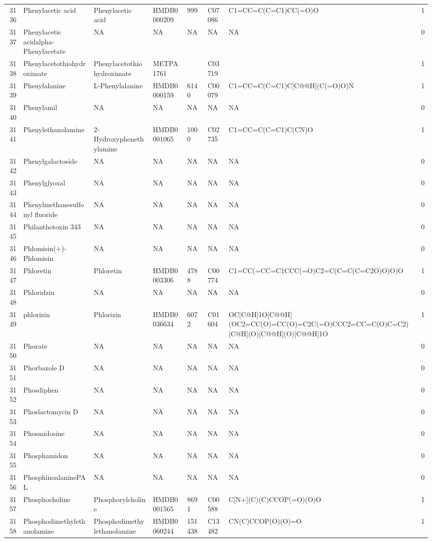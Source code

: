 \documentclass[a4paper]{article}
\begin{document}
\begin{longtable}{rlllllll}
  3136 & Phenylacetic acid & Phenylacetic acid & HMDB0000209 & 999 & C07086 & C1=CC=C(C=C1)CC(=O)O & 1 \\ 
  3137 & Phenylacetic acidalpha-Phenylacetate & NA & NA & NA & NA & NA & 0 \\ 
  3138 & Phenylacetothiohydroximate & Phenylacetothiohydroximate & METPA1761 &  & C03719 &  & 1 \\ 
  3139 & Phenylalanine & L-Phenylalanine & HMDB0000159 & 6140 & C00079 & C1=CC=C(C=C1)C[C@@H](C(=O)O)N & 1 \\ 
  3140 & Phenylamil & NA & NA & NA & NA & NA & 0 \\ 
  3141 & Phenylethanolamine & 2-Hydroxyphenethylamine & HMDB0001065 & 1000 & C02735 & C1=CC=C(C=C1)C(CN)O & 1 \\ 
  3142 & Phenylgalactoside & NA & NA & NA & NA & NA & 0 \\ 
  3143 & Phenylglyoxal & NA & NA & NA & NA & NA & 0 \\ 
  3144 & Phenylmethanesulfonyl fluoride & NA & NA & NA & NA & NA & 0 \\ 
  3145 & Philanthotoxin 343 & NA & NA & NA & NA & NA & 0 \\ 
  3146 & Phlomisin(+)-Phlomisin & NA & NA & NA & NA & NA & 0 \\ 
  3147 & Phloretin & Phloretin & HMDB0003306 & 4788 & C00774 & C1=CC(=CC=C1CCC(=O)C2=C(C=C(C=C2O)O)O)O & 1 \\ 
  3148 & Phloridzin & NA & NA & NA & NA & NA & 0 \\ 
  3149 & phlorizin & Phlorizin & HMDB0036634 & 6072 & C01604 & OC[C@H]1O[C@@H](OC2=CC(O)=CC(O)=C2C(=O)CCC2=CC=C(O)C=C2)[C@H](O)[C@@H](O)[C@@H]1O & 1 \\ 
  3150 & Phorate & NA & NA & NA & NA & NA & 0 \\ 
  3151 & Phorbazole D & NA & NA & NA & NA & NA & 0 \\ 
  3152 & Phosdiphen & NA & NA & NA & NA & NA & 0 \\ 
  3153 & Phoslactomycin D & NA & NA & NA & NA & NA & 0 \\ 
  3154 & Phosmidosine & NA & NA & NA & NA & NA & 0 \\ 
  3155 & Phosphamidon & NA & NA & NA & NA & NA & 0 \\ 
  3156 & PhosphinoalaninePAL & NA & NA & NA & NA & NA & 0 \\ 
  3157 & Phosphocholine & Phosphorylcholine & HMDB0001565 & 8691 & C00588 & C[N+](C)(C)CCOP(=O)(O)O & 1 \\ 
  3158 & Phosphodimethylethanolamine & Phosphodimethylethanolamine & HMDB0060244 & 151438 & C13482 & CN(C)CCOP(O)(O)=O & 1 \\ 

\end{longtable}
\end{document}

